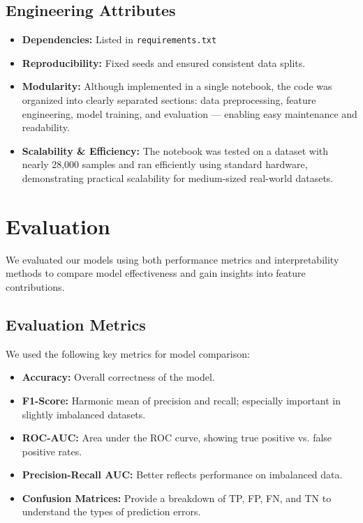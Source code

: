 \documentclass{article} %
\begin{document}
\subsection*{Engineering Attributes}

\begin{itemize}
    \item \textbf{Dependencies:} Listed in \texttt{requirements.txt}
    \item \textbf{Reproducibility:} Fixed seeds and ensured consistent data splits.
    \item \textbf{Modularity:} Although implemented in a single notebook, the code was organized into clearly separated sections: data preprocessing, feature engineering, model training, and evaluation — enabling easy maintenance and readability.
    \item \textbf{Scalability \& Efficiency:} The notebook was tested on a dataset with nearly 28,000 samples and ran efficiently using standard hardware, demonstrating practical scalability for medium-sized real-world datasets.
\end{itemize}

\section{Evaluation}

We evaluated our models using both performance metrics and interpretability methods to compare model effectiveness and gain insights into feature contributions.

\subsection*{Evaluation Metrics}

We used the following key metrics for model comparison:

\begin{itemize}
    \item \textbf{Accuracy:} Overall correctness of the model.
    \item \textbf{F1-Score:} Harmonic mean of precision and recall; especially important in slightly imbalanced datasets.
    \item \textbf{ROC-AUC:} Area under the ROC curve, showing true positive vs. false positive rates.
    \item \textbf{Precision-Recall AUC:} Better reflects performance on imbalanced data.
    \item \textbf{Confusion Matrices:} Provide a breakdown of TP, FP, FN, and TN to understand the types of prediction errors.
\end{itemize}
\end{document}
